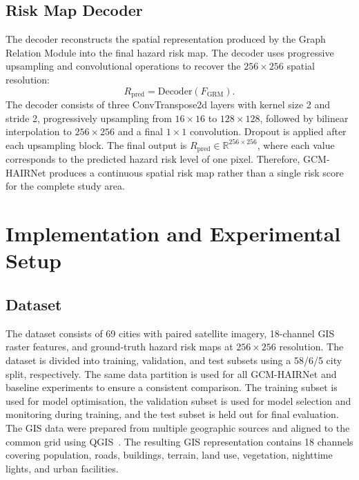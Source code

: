 \documentclass[sigconf, review=true]{acmart}
\begin{document}
\subsection{Risk Map Decoder}

The decoder reconstructs the spatial representation produced by the Graph Relation Module into the final hazard risk map. The decoder uses progressive upsampling and convolutional operations to recover the $256\times256$ spatial resolution:
\begin{equation}
  R_{\mathrm{pred}} = \mathrm{Decoder}(F_{\mathrm{GRM}}).
  \label{eq:decoder}
\end{equation}
The decoder consists of three ConvTranspose2d layers with kernel size 2 and stride 2, progressively upsampling from $16\times16$ to $128\times128$, followed by bilinear interpolation to $256\times256$ and a final $1\times1$ convolution. Dropout is applied after each upsampling block. The final output is $R_{\mathrm{pred}} \in \mathbb{R}^{256\times256}$, where each value corresponds to the predicted hazard risk level of one pixel. Therefore, GCM-HAIRNet produces a continuous spatial risk map rather than a single risk score for the complete study area.

\section{Implementation and Experimental Setup}

\subsection{Dataset}

The dataset consists of 69 cities with paired satellite imagery, 18-channel GIS raster features, and ground-truth hazard risk maps at $256\times256$ resolution. The dataset is divided into training, validation, and test subsets using a 58/6/5 city split, respectively. The same data partition is used for all GCM-HAIRNet and baseline experiments to ensure a consistent comparison. The training subset is used for model optimisation, the validation subset is used for model selection and monitoring during training, and the test subset is held out for final evaluation. The GIS data were prepared from multiple geographic sources and aligned to the common grid using QGIS~\cite{qgis2024}. The resulting GIS representation contains 18 channels covering population, roads, buildings, terrain, land use, vegetation, nighttime lights, and urban facilities.
\end{document}
